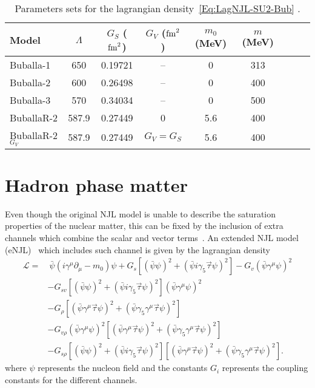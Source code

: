 \documentclass[plainsections,a0]{sciposterlocal}
\begin{document}
\begin{multicols}{2}
\begin{table}
\centering
\caption{Parameters sets for the lagrangian density~\eqref{Eq:LagNJL-SU2-Bub} \cite{Buballa1996, Buballa2005}. \label{Tab:Parametros_NJL}}
\begin{tabular}{lcccccccc}
\toprule
Model &  $\Lambda$ & $G_S$ ($\rm{fm}^2$) & $G_V$ ($\rm{fm}^2$) & $m_0$ (MeV) & $m$ (MeV) \\
\midrule
Buballa-1 & 650 & 0.19721 & -- & 0 & 313 \\
Buballa-2 & 600 & 0.26498 & -- & 0 & 400 \\
Buballa-3 & 570 & 0.34034 & -- & 0 & 500 \\
BuballaR-2 & 587.9 & 0.27449 & 0 & 5.6 & 400 \\
BuballaR-2$_{G_V}$ & 587.9 & 0.27449 & $G_V = G_S$ & 5.6 & 400\\
\bottomrule
\end{tabular}
\end{table}

\section*{Hadron phase matter}

Even though the original NJL model is unable to describe the saturation properties of the nuclear matter, this can be fixed by the inclusion of extra channels which combine the scalar and vector terms~\cite{Koch1987}. An extended NJL model (eNJL)~\cite{Pais2016} which includes such channel is given by the lagrangian density
\begin{equation}\label{Eq:Lagrangiana_eNLJ_Pais}
\begin{split}
	\mathcal{L} =&~ \bar{\psi}(i\gamma^\mu\partial_\mu - m_0)\psi + G_s[(\bar{\psi}\psi)^2 + (\bar{\psi}i\gamma_5\vec{\tau}\psi)^2] - G_v(\bar{\psi}\gamma^\mu\psi)^2 \\
	& - G_{sv}[(\bar{\psi}\psi)^2 + (\bar{\psi}i\gamma_5\vec{\tau}\psi)^2](\bar{\psi}\gamma^\mu\psi)^2 \\
	& - G_\rho[(\bar{\psi}\gamma^\mu\vec{\tau}\psi)^2 + (\bar{\psi}\gamma_5\gamma^\mu\vec{\tau}\psi)^2] \\
	& - G_{v\rho}(\bar{\psi}\gamma^\mu\psi)^2[(\bar{\psi}\gamma^\mu\vec{\tau}\psi)^2 + (\bar{\psi}\gamma_5\gamma^\mu\vec{\tau}\psi)^2] \\
	& - G_{s\rho} [(\bar{\psi}\psi)^2 + (\bar{\psi}i\gamma_5\vec{\tau}\psi)^2][(\bar{\psi}\gamma^\mu\vec{\tau}\psi)^2 + (\bar{\psi}\gamma_5\gamma^\mu\vec{\tau}\psi)^2].
\end{split}
\end{equation}
%
where $\psi$ represents the nucleon field and the constants $G_i$ represents the coupling constants for the different channels.


\end{multicols}
\end{document}
